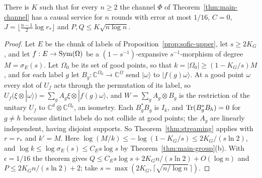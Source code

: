\begin{corollary}\label{cor:streaming-lamps}
There is $K$ such that for every $n\ge2$ the channel $\Phi$ of Theorem~\ref{thm:main-channel} has a causal service for $n$ rounds with error at most
$1/16$, $C=0$, $J=\lfloor\frac{n-1}2\log r_*\rfloor$ and $P,Q\le K\sqrt{n\log n}$.
\end{corollary}

\begin{proof}
Let $E$ be the chunk of labels of Proposition~\ref{prop:sofic-upper}, let $s\ge2K_G$, and let
$f:E\to\operatorname{Sym}(\Omega)$ be a $(1-s^{-1})$-expansive $s^{-1}$-morphism of degree $M=\sigma_E(s)$. Let $\Omega_0$ be its set of good points, so that
$k=|\Omega_0|\ge(1-K_G/s)M$, and for each label $g$ let $B_g:\mathbb C^{\Omega_0}\to\mathbb C^\Omega$ send $|\omega\rangle$ to $|f(g)\omega\rangle$. At a good point
$\omega$ every slot of $U_f$ acts through the permutation of its label, so $U_f(\xi\otimes|\omega\rangle)=\sum_gA_g\xi\otimes|f(g)\omega\rangle$, and
$W=\sum_gA_g\otimes B_g$ is the restriction of the unitary $U_f$ to $\mathbb C^d\otimes\mathbb C^{\Omega_0}$, an isometry. Each $B_g^*B_g$ is $I_k$, and
$\operatorname{Tr}(B_g^*B_h)=0$ for $g\ne h$ because distinct labels do not collide at good points; the $A_g$ are linearly independent, having disjoint
supports. So Theorem~\ref{thm:streaming} applies with $r=r_*$ and $k'=M$. Here $\log(M/k)\le-\log(1-K_G/s)\le2K_G/(s\ln2)$, and
$\log k\le\log\sigma_E(s)\le C_Es\log s$ by Theorem~\ref{thm:main-group}(b). With $\epsilon=1/16$ the theorem gives
$Q\le C_Es\log s+2K_Gn/(s\ln2)+O(\log n)$ and $P\le2K_Gn/(s\ln2)+2$; take $s=\max(2K_G,\lceil\sqrt{n/\log n}\,\rceil)$.
\end{proof}
